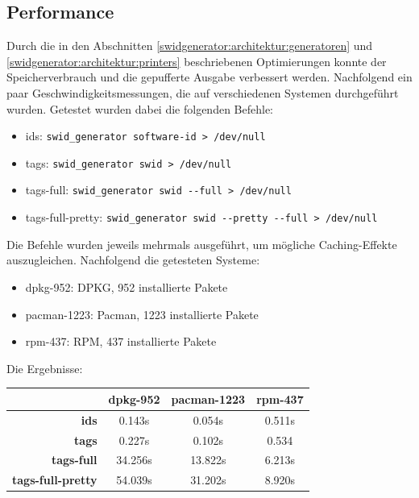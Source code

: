 \subsection{Performance}

Durch die in den Abschnitten \ref{swidgenerator:architektur:generatoren} und
\ref{swidgenerator:architektur:printers} beschriebenen Optimierungen konnte der
Speicherverbrauch und die gepufferte Ausgabe verbessert werden.
Nachfolgend ein paar Geschwindigkeitsmessungen, die auf verschiedenen Systemen
durchgeführt wurden. Getestet wurden dabei die folgenden Befehle:

\begin{itemize}
	\item ids: \texttt{swid\_generator software-id > /dev/null}
	\item tags: \texttt{swid\_generator swid > /dev/null}
	\item tags-full: \texttt{swid\_generator swid -{}-full > /dev/null}
	\item tags-full-pretty: \texttt{swid\_generator swid -{}-pretty -{}-full > /dev/null}
\end{itemize}

Die Befehle wurden jeweils mehrmals ausgeführt, um mögliche Caching-Effekte
auszugleichen. Nachfolgend die getesteten Systeme:

\begin{itemize}
	\item dpkg-952: DPKG, 952 installierte Pakete
	\item pacman-1223: Pacman, 1223 installierte Pakete
	\item rpm-437: RPM, 437 installierte Pakete
\end{itemize}

Die Ergebnisse:

\begin{tabularx}{\textwidth}{rCCC}
	& \textbf{dpkg-952} & \textbf{pacman-1223} & \textbf{rpm-437} \\
	\hline
	\textbf{ids} & 0.143s & 0.054s & 0.511s \\
	\hline
	\textbf{tags} & 0.227s & 0.102s & 0.534\\
	\hline
	\textbf{tags-full} & 34.256s & 13.822s & 6.213s \\
	\hline
	\textbf{tags-full-pretty} & 54.039s & 31.202s & 8.920s \\
	\hline
\end{tabularx}

\vspace{1.5em}

